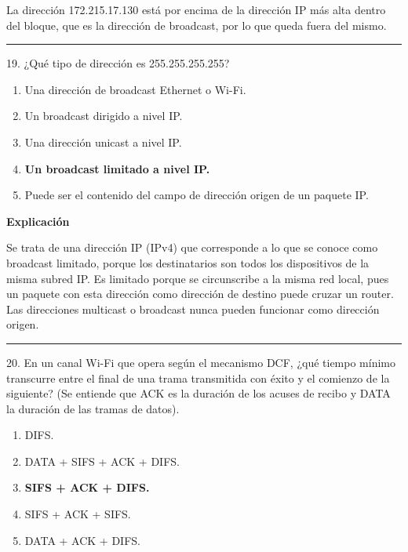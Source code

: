 \documentclass[10pt,a4paper]{article}
\begin{document}
La dirección 172.215.17.130 está por encima de la dirección IP más alta dentro del bloque, que es la dirección de broadcast, por lo que queda fuera del mismo.

\vspace{15pt} \hrule \vspace{15pt}




19.  ¿Qué tipo de dirección es 255.255.255.255?


\begin{enumerate}[label=\alph*]
    \item Una dirección de broadcast Ethernet o Wi-Fi.
    \item Un broadcast dirigido a nivel IP.
    \item Una dirección unicast a nivel IP.
    \item \textbf{Un broadcast limitado a nivel IP.}
    \item Puede ser el contenido del campo de dirección origen de un paquete IP.
\end{enumerate}

\textbf{Explicación}

Se trata de una dirección IP (IPv4) que corresponde a lo que se conoce como broadcast limitado, porque los destinatarios son todos los dispositivos de la misma subred IP. Es limitado porque se circunscribe a la misma red local, pues un paquete con esta dirección como dirección de destino puede cruzar un router. Las direcciones multicast o broadcast nunca pueden funcionar como dirección origen.

\vspace{15pt} \hrule \vspace{15pt}




20.  En un canal Wi-Fi que opera según el mecanismo DCF, ¿qué tiempo mínimo transcurre entre el final de una trama transmitida con éxito y el comienzo de la siguiente? (Se entiende que ACK es la duración de los acuses de recibo y DATA la duración de las tramas de datos).

\begin{enumerate}[label=\alph*]
    \item DIFS.
    \item DATA + SIFS + ACK + DIFS.
    \item \textbf{SIFS + ACK + DIFS.}
    \item SIFS + ACK + SIFS.
    \item DATA + ACK + DIFS.
\end{enumerate}
\end{document}
